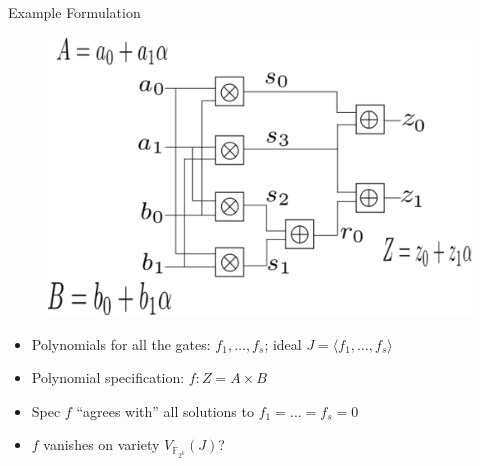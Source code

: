 \documentclass[xcolor=dvipsnames]{beamer}
\newcommand{\Fkk}{{\mathbb{F}}_{2^k}}
\begin{document}
\begin{frame}{Example Formulation}

\begin{figure}[hbt]
\centerline{
\includegraphics[scale=0.4]{drawing.eps}
}
\label{fig:mult-2-bit}
\end{figure}

\begin{itemize}
\item Polynomials for all the gates: $f_1, \dots, f_s$; ideal $J =
  \langle f_1, \dots, f_s\rangle$
\item Polynomial specification: $f: Z = A\times B$
\item Spec $f$ ``agrees with'' all solutions to $f_1 = \dots = f_s = 0$
\item $f$ vanishes on variety $V_{\Fkk}(J)$?
\end{itemize}

\end{frame}



\end{document}
